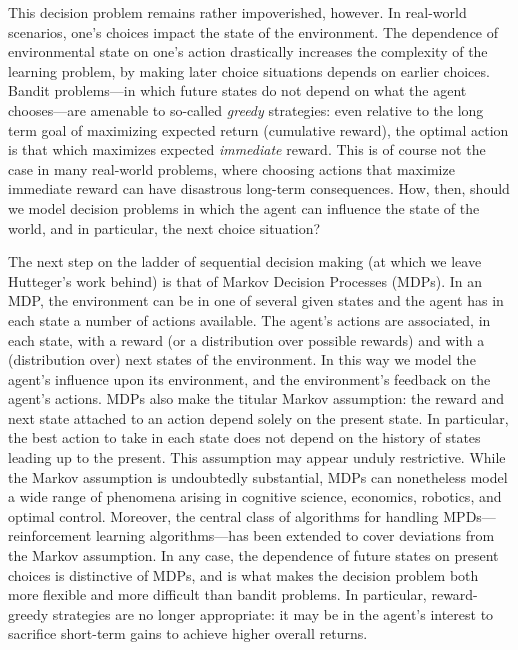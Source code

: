 \documentclass{article}
\begin{document}
This decision problem remains rather impoverished, however.
In real-world scenarios, one's choices impact the state of the environment.
The dependence of environmental state on one's action drastically increases the complexity of the learning problem, by making later choice situations depends on earlier choices.
Bandit problems---in which future states do not depend on what the agent chooses---are amenable to so-called \emph{greedy} strategies: even relative to the long term goal of maximizing expected return (cumulative reward), the optimal action is that which maximizes expected \emph{immediate} reward.
This is of course not the case in many real-world problems, where choosing actions that maximize immediate reward can have disastrous long-term consequences.
How, then, should we model decision problems in which the agent can influence the state of the world, and in particular, the next choice situation?

The next step on the ladder of sequential decision making (at which we leave Hutteger's work behind) is that of Markov Decision Processes (MDPs).
In an MDP, the environment can be in one of several given states and the agent has in each state a number of actions available.
The agent's actions are associated, in each state, with a reward (or a distribution over possible rewards) and with a (distribution over) next states of the environment.
In this way we model the agent's influence upon its environment, and the environment's feedback on the agent's actions.
MDPs also make the titular Markov assumption: the reward and next state attached to an action depend solely on the present state.
In particular, the best action to take in each state does not depend on the history of states leading up to the present.
This assumption may appear unduly restrictive.
While the Markov assumption is undoubtedly substantial, MDPs can nonetheless model a wide range of phenomena arising in cognitive science, economics, robotics, and optimal control.
Moreover, the central class of algorithms for handling MPDs---reinforcement learning algorithms---has been extended to cover deviations from the Markov assumption.
In any case, the dependence of future states on present choices is distinctive of MDPs, and is what makes the decision problem both more flexible and more difficult than bandit problems.
In particular, reward-greedy strategies are no longer appropriate: it may be in the agent's interest to sacrifice short-term gains to achieve higher overall returns.
\end{document}
